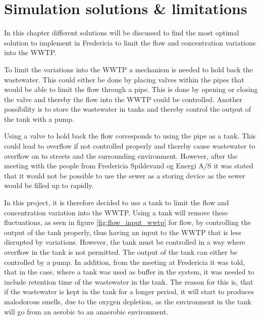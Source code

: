 
\chapter{Simulation solutions \& limitations }\label{ch:simulation_solution_and_limitation}
In this chapter different solutions will be discussed to find the most optimal solution to implement in Fredericia to limit the flow and concentration variations into the WWTP.

To limit the variations into the WWTP a mechanism is needed to hold back the wastewater. This could either be done by placing valves within the pipes that would be able to limit the flow through a pipe. This is done by opening or closing the valve and thereby the flow into the WWTP could be controlled. Another possibility is to store the wastewater in tanks and thereby control the output of the tank with a pump. 

Using a valve to hold back the flow corresponds to using the pipe as a tank. This could lead to overflow if not controlled properly and thereby cause wastewater to overflow on to streets and the surrounding environment. %
However, after the meeting with the people from Fredericia Spildevand og Energi A/S it was stated that it would not be possible to use the sewer as a storing device as the sewer would be filled up to rapidly.     

In this project, it is therefore decided to use a tank to limit the flow and concentration variation into the WWTP. Using a tank will remove these fluctuations, as seen in figure \ref{fig:flow_input_wwtp} for flow, by controlling the output of the tank properly, thus having an input to the WWTP that is less disrupted by variations. %
However, the tank must be controlled in a way where overflow in the tank is not permitted. The output of the tank can either be controlled by a pump. %
In addition, from the meeting at Fredericia it was told, that in the case, where a tank was used as buffer in the system, it was needed to include retention time of the wastewater in the tank. The reason for this is, that if the wastewater is kept in the tank for a longer period, it will start to produces malodorous smells, due to the oxygen depletion, as the environment in the tank will go from an aerobic to an anaerobic environment. 

